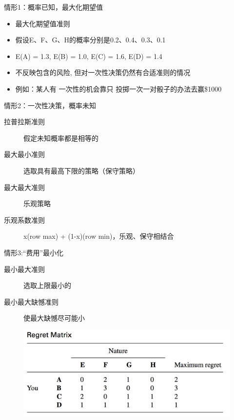 \documentclass[UTF8]{ctexbeamer}
\begin{document}
\begin{frame}{情形1：概率已知，最大化期望值}
  \begin{itemize}
  \item<1-> 最大化期望值准则
  \item<1-> 假设E、F、G、H的概率分别是0.2、0.4、0.3、0.1
  \item<2-> E(A) = 1.3, E(B) = 1.0, {\color{red} E(C) = 1.6}, E(D) = 1.4
  \item<3-> 不反映包含的风险, 但对一次性决策仍然有合适准则的情况
  \item<4-> 例如：某人有{\color{red} 一次性}的机会靠只{\color{red} 投掷一次}一对骰子的办法去赢\$1000
  \end{itemize}
  
\end{frame}

\begin{frame}{情形2：一次性决策，概率未知}

  \begin{description}
  \item[拉普拉斯准则] 假定未知概率都是相等的
  \item[最大最小准则] 选取具有最高下限的策略（保守策略）
  \item[最大最大准则] 乐观策略
  \item[乐观系数准则] x(row max) + (1-x)(row min)，乐观、保守相结合
  \end{description}
  
\end{frame}

\begin{frame}{情形3:“费用”最小化}

  \begin{description}
  \item[最小最大准则] 选取上限最小的
  \item[最小最大缺憾准则] 使最大缺憾尽可能小
  \end{description}
  
  \begin{figure}
    \includegraphics[width=0.8\textwidth{}]{regret.png}
  \end{figure}

\end{frame}
\end{document}
